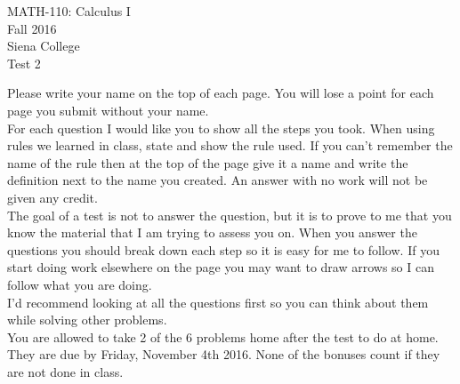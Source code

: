 \documentclass[11pt]{article}
\begin{document}
	\begin{center}
		MATH-110: Calculus I\\
		Fall 2016\\
		Siena College\\
		\vspace{.1in}
		Test 2
	\end{center}
	\vspace{.1in}
	
	Please write your name on the top of each page. You will lose a point for each page you submit without your name.\\
	
	For each question I would like you to show all the steps you took.  When using rules we learned in class, state and show the rule used.  If you can't remember the name of the rule then at the top of the page give it a name and write the definition next to the name you created.  An answer with no work will not be given any credit.\\
	
	The goal of a test is not to answer the question, but it is to prove to me that you know the material that I am trying to assess you on.  When you answer the questions you should break down each step so it is easy for me to follow.  If you start doing work elsewhere on the page you may want to draw arrows so I can follow what you are doing.\\
	
	I'd recommend looking at all the questions first so you can think about them while solving other problems.  \\
	
	You are allowed to take 2 of the 6 problems home after the test to do at home.  They are due by Friday, November 4th 2016.  None of the bonuses count if they are not done in class.
	
\end{document}

